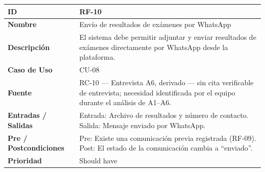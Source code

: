 \documentclass[
]{article}
\newcounter{none} %
\begin{document}
{\def\LTcaptype{none} %
\begin{longtable}[]{|
  >{\raggedright\arraybackslash}p{}|
  >{\raggedright\arraybackslash}p{}|}
\hline
\begin{minipage}[b]{\linewidth}\raggedright
\textbf{ID}
\end{minipage} & \begin{minipage}[b]{\linewidth}\raggedright
RF-10
\end{minipage} \\
\hline
\endhead
\hline
\endlastfoot
\textbf{Nombre} & \begin{minipage}[t]{\linewidth}\raggedright
Envío de resultados de exámenes por WhatsApp
\end{minipage} \\
\hline
\textbf{Descripción} & \begin{minipage}[t]{\linewidth}\raggedright
El sistema debe permitir adjuntar y enviar resultados de exámenes directamente por WhatsApp desde la plataforma.
\end{minipage} \\
\hline
\textbf{Caso de Uso} & \begin{minipage}[t]{\linewidth}\raggedright
CU-08
\end{minipage} \\
\hline
\textbf{Fuente} & \begin{minipage}[t]{\linewidth}\raggedright
RC-10 — Entrevista A6, derivado — sin cita verificable de entrevista; necesidad identificada por el equipo durante el análisis de A1–A6.
\end{minipage} \\
\hline
\textbf{Entradas / Salidas} & \begin{minipage}[t]{\linewidth}\raggedright
Entrada: Archivo de resultados y número de contacto. Salida: Mensaje enviado por WhatsApp.
\end{minipage} \\
\hline
\textbf{Pre / Postcondiciones} & \begin{minipage}[t]{\linewidth}\raggedright
Pre: Existe una comunicación previa registrada (RF-09). Post: El estado de la comunicación cambia a “enviado”.
\end{minipage} \\
\hline
\textbf{Prioridad} & \begin{minipage}[t]{\linewidth}\raggedright
Should have
\end{minipage} \\

\end{longtable}}
\end{document}
